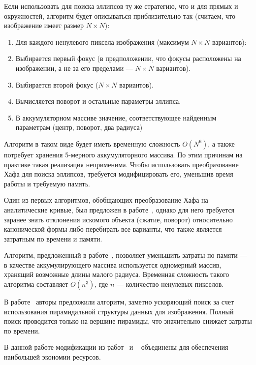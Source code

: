 Если использовать для поиска эллипсов ту же стратегию, что и для прямых и окружностей, алгоритм будет описываться приблизительно так (считаем, что изображение имеет размер $N \times N$):
\begin{enumerate}
\item Для каждого ненулевого пиксела изображения (максимум $N \times N$ вариантов):
\item Выбирается первый фокус (в предположении, что фокусы расположены на изображении, а не за его пределами --- $N \times N$ вариантов).
\item Выбирается второй фокус ($N \times N$ вариантов).
\item Вычисляется поворот и остальные параметры эллипса.
\item В аккумуляторном массиве значение, соответствующее найденным параметрам (центр, поворот, два радиуса)
\end{enumerate}

Алгоритм в таком виде будет иметь временную сложность \(O(N^6)\), а также потребует хранения 5-мерного аккумуляторного массива. По этим причинам на практике такая реализация неприменима.
Чтобы использовать преобразование Хафа для поиска эллипсов, требуется модифицировать его, уменьшив время работы и требуемую память.

Один из первых алгоритмов, обобщающих преобразование Хафа на аналитические кривые, был предложен в работе~\autocite{Ballard}, 
однако для него требуется заранее знать отклонения искомого объекта (сжатие, поворот) относительно канонической формы либо перебирать все варианты, что также является затратным по времени и памяти.

Алгоритм, предложенный в работе~\autocite{OneDim}, позволяет уменьшить затраты по памяти --- в качестве аккумулирующего массива используется одномерный массив, хранящий возможные длины малого радиуса.
Временная сложность такого алгоритма составляет \(O(n^3)\), где \(n\) --- количество ненулевых пикселов.

В работе~\autocite{Chien} авторы предложили алгоритм, заметно ускоряющий поиск за счет использования пирамидальной структуры данных для изображения. 
Полный поиск проводится только на вершине пирамиды, что значительно снижает затраты по времени.

В данной работе модификации из работ~\autocite{OneDim} и ~\autocite{Chien} объединены для обеспечения наибольшей экономии ресурсов.

